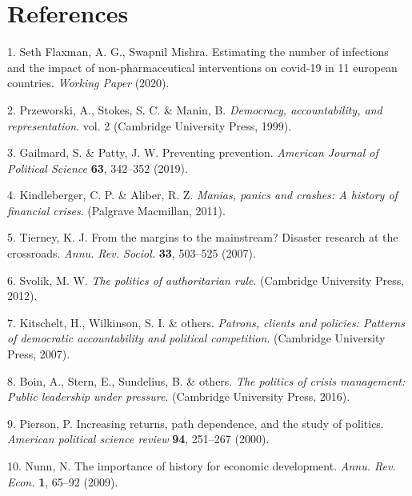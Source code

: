 \documentclass[
]{article}
\newenvironment{cslreferences}%
  {}%
  {\par}
\begin{document}
\hypertarget{references}{%
\section*{References}\label{references}}

\hypertarget{refs}{}
\begin{cslreferences}
\leavevmode\hypertarget{ref-flaxman2020}{}%
1. Seth Flaxman, A. G., Swapnil Mishra. Estimating the number of infections and the impact of non-pharmaceutical interventions on covid-19 in 11 european countries. \emph{Working Paper} (2020).

\leavevmode\hypertarget{ref-przeworski1999democracy}{}%
2. Przeworski, A., Stokes, S. C. \& Manin, B. \emph{Democracy, accountability, and representation}. vol. 2 (Cambridge University Press, 1999).

\leavevmode\hypertarget{ref-gailmard2019preventing}{}%
3. Gailmard, S. \& Patty, J. W. Preventing prevention. \emph{American Journal of Political Science} \textbf{63}, 342--352 (2019).

\leavevmode\hypertarget{ref-kindleberger2011manias}{}%
4. Kindleberger, C. P. \& Aliber, R. Z. \emph{Manias, panics and crashes: A history of financial crises}. (Palgrave Macmillan, 2011).

\leavevmode\hypertarget{ref-tierney2007margins}{}%
5. Tierney, K. J. From the margins to the mainstream? Disaster research at the crossroads. \emph{Annu. Rev. Sociol.} \textbf{33}, 503--525 (2007).

\leavevmode\hypertarget{ref-svolik2012politics}{}%
6. Svolik, M. W. \emph{The politics of authoritarian rule}. (Cambridge University Press, 2012).

\leavevmode\hypertarget{ref-kitschelt2007patrons}{}%
7. Kitschelt, H., Wilkinson, S. I. \& others. \emph{Patrons, clients and policies: Patterns of democratic accountability and political competition}. (Cambridge University Press, 2007).

\leavevmode\hypertarget{ref-boin2016politics}{}%
8. Boin, A., Stern, E., Sundelius, B. \& others. \emph{The politics of crisis management: Public leadership under pressure}. (Cambridge University Press, 2016).

\leavevmode\hypertarget{ref-pierson2000increasing}{}%
9. Pierson, P. Increasing returns, path dependence, and the study of politics. \emph{American political science review} \textbf{94}, 251--267 (2000).

\leavevmode\hypertarget{ref-nunn2009importance}{}%
10. Nunn, N. The importance of history for economic development. \emph{Annu. Rev. Econ.} \textbf{1}, 65--92 (2009).


\end{cslreferences}
\end{document}
